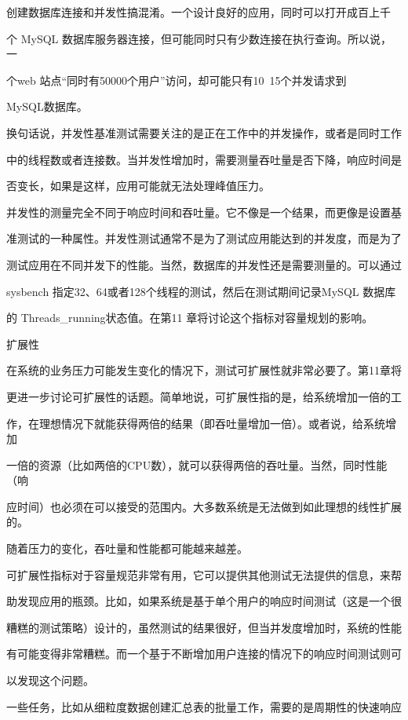 创建数据库连接和并发性搞混淆。一个设计良好的应用，同时可以打开成百上千

个 MySQL 数据库服务器连接，但可能同时只有少数连接在执行查询。所以说，一

个web 站点“同时有50000个用户”访问，却可能只有10~15个并发请求到

MySQL数据库。

换句话说，并发性基准测试需要关注的是正在工作中的并发操作，或者是同时工作

中的线程数或者连接数。当并发性增加时，需要测量吞吐量是否下降，响应时间是

否变长，如果是这样，应用可能就无法处理峰值压力。

并发性的测量完全不同于响应时间和吞吐量。它不像是一个结果，而更像是设置基

准测试的一种属性。并发性测试通常不是为了测试应用能达到的并发度，而是为了

测试应用在不同并发下的性能。当然，数据库的并发性还是需要测量的。可以通过

sysbench 指定32、64或者128个线程的测试，然后在测试期间记录MySQL 数据库

的 Threads\_running状态值。在第11 章将讨论这个指标对容量规划的影响。

扩展性

在系统的业务压力可能发生变化的情况下，测试可扩展性就非常必要了。第11章将

更进一步讨论可扩展性的话题。简单地说，可扩展性指的是，给系统增加一倍的工

作，在理想情况下就能获得两倍的结果（即吞吐量增加一倍）。或者说，给系统增加

一倍的资源（比如两倍的CPU数），就可以获得两倍的吞吐量。当然，同时性能（响

应时间）也必须在可以接受的范围内。大多数系统是无法做到如此理想的线性扩展的。

随着压力的变化，吞吐量和性能都可能越来越差。

可扩展性指标对于容量规范非常有用，它可以提供其他测试无法提供的信息，来帮

助发现应用的瓶颈。比如，如果系统是基于单个用户的响应时间测试（这是一个很

糟糕的测试策略）设计的，虽然测试的结果很好，但当并发度增加时，系统的性能

有可能变得非常糟糕。而一个基于不断增加用户连接的情况下的响应时间测试则可

以发现这个问题。

一些任务，比如从细粒度数据创建汇总表的批量工作，需要的是周期性的快速响应

